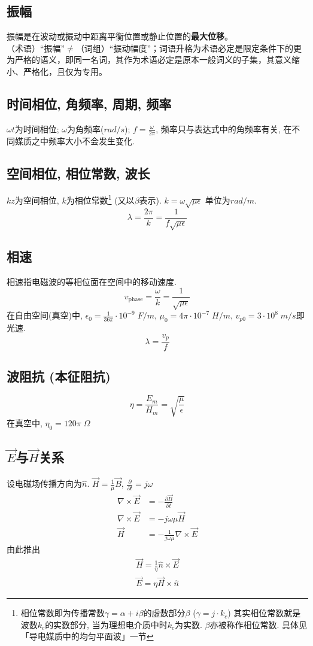 \documentclass[a4paper]{report}
\begin{document}
\subsection{振幅}
振幅是在波动或振动中距离平衡位置或静止位置的\textbf{最大位移}。\\
（术语）“振幅”$\neq$（词组）“振动幅度”；词语升格为术语必定是限定条件下的更为严格的语义，即同一名词，其作为术语必定是原本一般词义的子集，其意义缩小、严格化，且仅为专用。\\
\subsection{时间相位, 角频率, 周期, 频率}
$\omega t$为时间相位; $\omega$为角频率($rad/s$); $f=\frac{\omega}{2\pi}$, 频率只与表达式中的角频率有关, 在不同媒质之中频率大小不会发生变化. 

\subsection{空间相位, 相位常数, 波长}
$kz$为空间相位, $k$为相位常数\footnote{相位常数即为传播常数$\gamma=\alpha+i\beta$的虚数部分$\beta$ ($\gamma=j\cdot k_c$) 其实相位常数就是波数$k_c$的实数部分, 当为理想电介质中时$k_c$为实数. $\beta$亦被称作相位常数. 具体见「导电媒质中的均匀平面波」一节} (又以$\beta$表示). $k=\omega\sqrt{\mu\epsilon}$ 单位为$rad/m$. $$\lambda=\frac{2\pi}{k}=\frac{1}{f\sqrt{\mu\epsilon}}$$
\subsection{相速}
相速指电磁波的等相位面在空间中的移动速度. 
$$v_{\text{phase}}=\frac{\omega}{k}=\frac{1}{\sqrt{\mu\epsilon}}$$
在自由空间(真空)中, $\epsilon_0=\frac{1}{36\pi}\cdot 10^{-9}\;F/m$, $\mu_0=4\pi\cdot 10^{-7}\;H/m$, $v_{p0}=3\cdot 10^8 \;m/s$即光速. 
$$\lambda=\frac{v_p}{f}$$
\subsection{波阻抗 (本征阻抗)}
$$\eta=\frac{E_m}{H_m}=\sqrt{\frac{\mu}{\epsilon}}$$
在真空中, $\eta_0=120\pi\;\Omega$
\subsection{$\vec{E} $与$\vec{H} $关系}
设电磁场传播方向为$\hat{n}$. $\vec{H}=\frac{1}{\mu}\vec{B}  $, $\frac{\partial }{\partial t}=j\omega $
\begin{align*}
    \nabla\times \vec{E}&=-\frac{\partial \vec{B} }{\partial t}\\
    \nabla\times \vec{E}&=-j\omega \mu \vec{H}  \\
    \vec{H}&=-\frac{1}{j\omega \mu}\nabla\times \vec{E}
\end{align*}
由此推出
\begin{align*}
    \vec{H}=\frac{1}{\eta}\hat{n}\times \vec{E}  \\
\vec{E}=\eta \vec{H}\times \hat{n}  
\end{align*}
\end{document}
